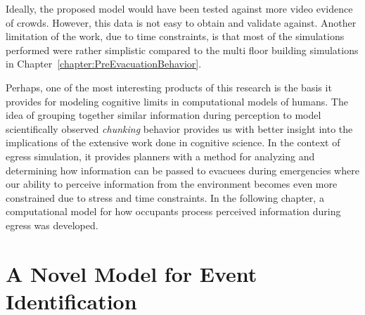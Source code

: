 
Ideally, the proposed model would have been tested against more video evidence of crowds. However, this data is not easy to obtain and validate against. Another limitation of the work, due to time constraints, is that most of the simulations performed were rather simplistic compared to the multi floor building simulations in Chapter~\ref{chapter:PreEvacuationBehavior}.




Perhaps, one of the most interesting products of this research is the basis it provides for modeling cognitive limits in computational models of humans. The idea of grouping together similar information during perception to model scientifically observed \emph{chunking} behavior provides us with better insight into the implications of the extensive work done in cognitive science. In the context of egress simulation, it provides planners with a method for analyzing and determining how information can be passed to evacuees during emergencies where our ability to perceive information from the environment becomes even more constrained due to stress and time constraints.  In the following chapter, a computational model for how occupants process perceived information during egress was developed.


\section{A Novel Model for Event Identification} %
\label{sec:a_novel_model_for_pre_evacuation_behavior}


